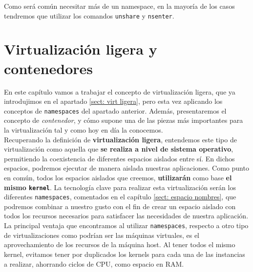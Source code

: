 \documentclass[a4paper, oneside, 12pt]{book}
\begin{document}
	\noindent Como será común necesitar más de un namespace, en la mayoría de los casos tendremos que utilizar los comandos \texttt{unshare} y \texttt{nsenter}.

	\pagebreak
	
	\chapter{Virtualización ligera y contenedores}
	\label{sec: virt ligera y contenedores}
	
	\noindent En este capítulo vamos a trabajar el concepto de virtualización ligera, que ya introdujimos en el apartado \ref{sect: virt ligera}, pero esta vez aplicando los conceptos de \texttt{namespaces} del apartado anterior. Además, presentaremos el concepto de \textit{contenedor}, y cómo supone una de las piezas más importantes para la virtualización tal y como hoy en día la conocemos. \\
	
	\noindent Recuperando la definición de \textbf{virtualización ligera}, entendemos este tipo de virtualización como aquella que \textbf{se realiza a nivel de sistema operativo}, permitiendo la coexistencia de diferentes espacios aislados entre sí. En dichos espacios, podremos ejecutar de manera aislada nuestras aplicaciones. Como punto en común, todos los espacios aislados que creemos, \textbf{utilizarán} como base \textbf{el mismo \texttt{kernel}}. La tecnología clave para realizar esta virtualización serán los diferentes \texttt{namespaces}, comentados en el capítulo \ref{sect: espacio nombres}, que podremos combinar a nuestro gusto con el fin de crear un espacio aislado con todos los recursos necesarios para satisfacer las necesidades de nuestra aplicación. \\
	
	\noindent La principal ventaja que encontramos al utilizar \texttt{namespaces}, respecto a otro tipo de virtualizaciones como podrían ser las máquinas virtuales, es el aprovechamiento de los recursos de la máquina host. Al tener todos el mismo kernel, evitamos tener por duplicados los kernels para cada una de las instancias a realizar, ahorrando ciclos de CPU, como espacio en RAM.\\
	
\end{document}
